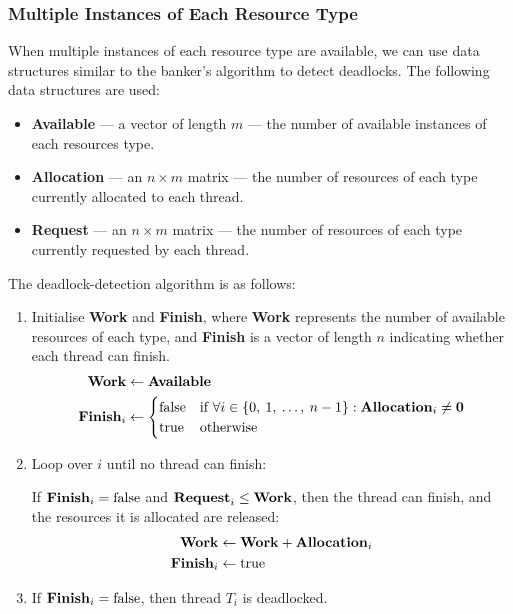 \documentclass{article}
\begin{document}
\subsubsection{Multiple Instances of Each Resource Type}
When multiple instances of each resource type are available, we can use
data structures similar to the banker's algorithm to detect deadlocks.
The following data structures are used:
\begin{itemize}
    \item \textbf{Available} --- a vector of length \(m\) --- the number of available instances of each resources type.
    \item \textbf{Allocation} --- an \(n \times m\) matrix --- the
          number of resources of each type currently allocated to each
          thread.
    \item \textbf{Request} --- an \(n \times m\) matrix --- the
          number of resources of each type currently requested by each
          thread.
\end{itemize}
The deadlock-detection algorithm is as follows:
\begin{enumerate}
    \item Initialise \textbf{Work} and \textbf{Finish}, where
          \textbf{Work} represents the number of available resources of
          each type, and \textbf{Finish} is a vector of length \(n\)
          indicating whether each thread can finish.
          \begin{align*}
              \text{\textbf{Work}}     & \gets \text{\textbf{Available}} \\
              \text{\textbf{Finish}}_i & \gets
              \begin{cases}
                  \text{false} & \text{if } \forall i \in \left\{ 0,\: 1,\: \ldots,\: n-1 \right\} : \text{\textbf{Allocation}}_i \neq \textbf{0} \\
                  \text{true}  & \text{otherwise}
              \end{cases}
          \end{align*}
    \item Loop over \(i\) until no thread can finish:

          If \(\text{\textbf{Finish}}_i = \text{false}\) and
          \(\text{\textbf{Request}}_i \leq \text{\textbf{Work}}\), then
          the thread can finish, and the resources it is allocated are
          released:
          \begin{align*}
              \text{\textbf{Work}}     & \gets \text{\textbf{Work}} + \text{\textbf{Allocation}}_i \\
              \text{\textbf{Finish}}_i & \gets \text{true}
          \end{align*}
    \item If \(\text{\textbf{Finish}}_i = \text{false}\), then thread
          \(T_i\) is deadlocked.
\end{enumerate}
\end{document}
